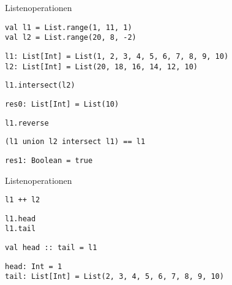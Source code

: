 \documentclass[14pt,aspectratio=169,trans]{beamer} %
\begin{document}
\begin{frame}[fragile]{}
	\begin{block}{Listenoperationen}
		\scriptsize

\begin{lstlisting}[firstnumber=1]
val l1 = List.range(1, 11, 1)
val l2 = List.range(20, 8, -2)
\end{lstlisting}

\begin{lstlisting}[firstnumber=3]
l1: List[Int] = List(1, 2, 3, 4, 5, 6, 7, 8, 9, 10)
l2: List[Int] = List(20, 18, 16, 14, 12, 10)
\end{lstlisting}

\begin{lstlisting}[firstnumber=5]
l1.intersect(l2)
\end{lstlisting}

\begin{lstlisting}[firstnumber=6]
res0: List[Int] = List(10)
\end{lstlisting}

\begin{lstlisting}[firstnumber=7]
l1.reverse
\end{lstlisting}

\begin{lstlisting}[firstnumber=8]
(l1 union l2 intersect l1) == l1
\end{lstlisting}

\begin{lstlisting}[firstnumber=9]
res1: Boolean = true
\end{lstlisting}
	\end{block}
	\note{}
\end{frame}

\begin{frame}[fragile]{}
	\begin{block}{Listenoperationen}
		\scriptsize
{}
\begin{lstlisting}[firstnumber=10]
l1 ++ l2
\end{lstlisting}
\begin{lstlisting}[firstnumber=11]
l1.head
l1.tail
\end{lstlisting}
\begin{lstlisting}[firstnumber=13]
val head :: tail = l1
\end{lstlisting}	

\begin{lstlisting}[firstnumber=14]
head: Int = 1
tail: List[Int] = List(2, 3, 4, 5, 6, 7, 8, 9, 10)
\end{lstlisting}	
\end{block}
	\note{}
\end{frame}
\end{document}
